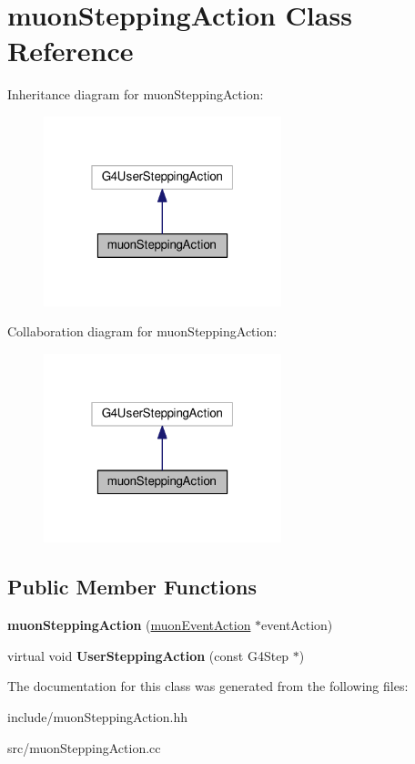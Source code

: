 \hypertarget{classmuonSteppingAction}{}\section{muon\+Stepping\+Action Class Reference}
\label{classmuonSteppingAction}


Inheritance diagram for muon\+Stepping\+Action\+:\nopagebreak
\begin{figure}[H]
\begin{center}
\leavevmode
\includegraphics[width=196pt]{classmuonSteppingAction__inherit__graph}
\end{center}
\end{figure}


Collaboration diagram for muon\+Stepping\+Action\+:\nopagebreak
\begin{figure}[H]
\begin{center}
\leavevmode
\includegraphics[width=196pt]{classmuonSteppingAction__coll__graph}
\end{center}
\end{figure}
\subsection*{Public Member Functions}
\begin{DoxyCompactItemize}
\item 
\mbox{\label{classmuonSteppingAction_af61195514a24d468d05e62b421b360f1}} 
{\bfseries muon\+Stepping\+Action} (\hyperlink{classmuonEventAction}{muon\+Event\+Action} $\ast$event\+Action)
\item 
\mbox{\label{classmuonSteppingAction_a8e1d7a65edc88bab12e7b0ff91ee7183}} 
virtual void {\bfseries User\+Stepping\+Action} (const G4\+Step $\ast$)
\end{DoxyCompactItemize}


The documentation for this class was generated from the following files\+:\begin{DoxyCompactItemize}
\item 
include/muon\+Stepping\+Action.\+hh\item 
src/muon\+Stepping\+Action.\+cc\end{DoxyCompactItemize}
